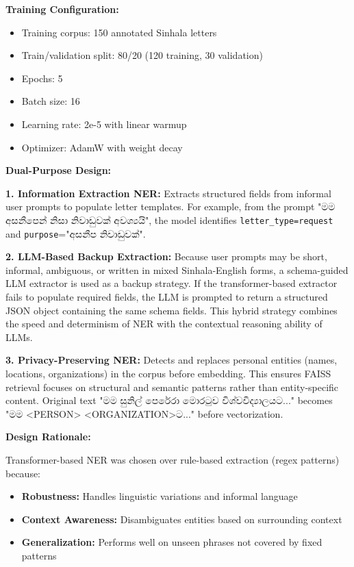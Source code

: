 \documentclass[12pt]{uomthesis}
\begin{document}
\textbf{Training Configuration:}
\begin{itemize}
    \item Training corpus: 150 annotated Sinhala letters
    \item Train/validation split: 80/20 (120 training, 30 validation)
    \item Epochs: 5
    \item Batch size: 16
    \item Learning rate: 2e-5 with linear warmup
    \item Optimizer: AdamW with weight decay
\end{itemize}

\textbf{Dual-Purpose Design:}

\textbf{1. Information Extraction NER:}
Extracts structured fields from informal user prompts to populate letter templates. For example, from the prompt "මම අසනීපෙන් නිසා නිවාඩුවක් අවශ්‍යයි", the model identifies \texttt{letter\_type=request} and \texttt{purpose}="අසනීප නිවාඩුවක්".

\textbf{2. LLM-Based Backup Extraction:}
Because user prompts may be short, informal, ambiguous, or written in mixed Sinhala-English forms, a schema-guided LLM extractor is used as a backup strategy. If the transformer-based extractor fails to populate required fields, the LLM is prompted to return a structured JSON object containing the same schema fields. This hybrid strategy combines the speed and determinism of NER with the contextual reasoning ability of LLMs.

\textbf{3. Privacy-Preserving NER:}
Detects and replaces personal entities (names, locations, organizations) in the corpus before embedding. This ensures FAISS retrieval focuses on structural and semantic patterns rather than entity-specific content. Original text "මම සුනිල් පෙරේරා මොරටුව විශ්වවිද්‍යාලයට..." becomes "මම <PERSON> <ORGANIZATION>ට..." before vectorization.

\textbf{Design Rationale:}

Transformer-based NER was chosen over rule-based extraction (regex patterns) because:
\begin{itemize}
    \item \textbf{Robustness:} Handles linguistic variations and informal language
    \item \textbf{Context Awareness:} Disambiguates entities based on surrounding context
    \item \textbf{Generalization:} Performs well on unseen phrases not covered by fixed patterns
\end{itemize}
\end{document}

